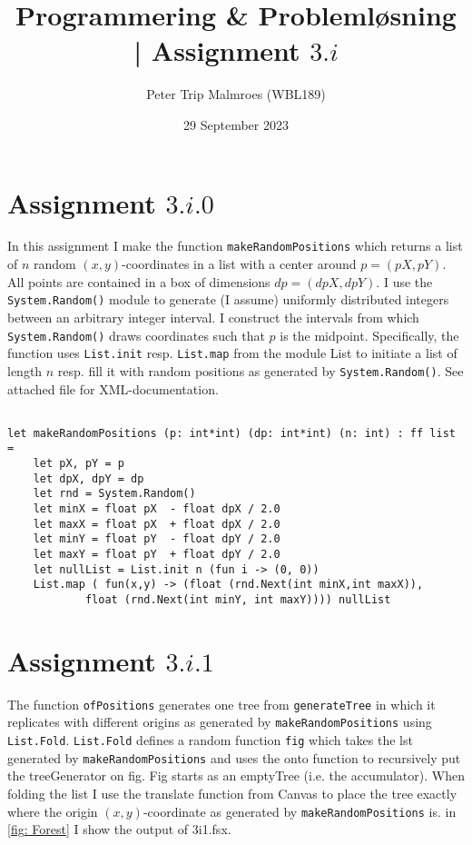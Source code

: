 \documentclass[a4paper]{article}
\title{Programmering \& Problemløsning | Assignment $3.i$}
\author{Peter Trip Malmroes (WBL189) }
\date{29 September 2023}
\begin{document}
\maketitle %

\section*{Assignment $3.i.0$}

In this assignment I make the function \verb|makeRandomPositions| which returns a list of $n$ random $(x,y)$-coordinates in a list with a center around $p=(pX,pY)$. All points are contained in a box of dimensions $dp = (dpX,dpY)$. I use the \verb|System.Random()| module to generate (I assume) uniformly distributed integers between an arbitrary integer interval. I construct the intervals from which \verb|System.Random()| draws coordinates such that $p$ is the midpoint. Specifically, the function uses \verb|List.init| resp. \verb|List.map| from the module List to initiate a list of length $n$ resp. fill it with random positions as generated by \verb|System.Random()|. See attached file for XML-documentation. 



\lstset{language=FSharp}
\begin{lstlisting}

let makeRandomPositions (p: int*int) (dp: int*int) (n: int) : ff list =
    let pX, pY = p 
    let dpX, dpY = dp
    let rnd = System.Random()
    let minX = float pX  - float dpX / 2.0 
    let maxX = float pX  + float dpX / 2.0
    let minY = float pY  - float dpY / 2.0
    let maxY = float pY  + float dpY / 2.0
    let nullList = List.init n (fun i -> (0, 0))
    List.map ( fun(x,y) -> (float (rnd.Next(int minX,int maxX)),
            float (rnd.Next(int minY, int maxY)))) nullList
\end{lstlisting}

\pagebreak

\section*{Assignment $3.i.1$}

The function \verb|ofPositions| generates one tree from \verb|generateTree| in which it replicates with different origins as generated by \verb|makeRandomPositions| using \verb|List.Fold|. \verb|List.Fold| defines a random function \verb|fig| which takes the lst generated by \verb|makeRandomPositions| and uses the onto function to recursively put the treeGenerator on fig. Fig starts as an emptyTree (i.e. the accumulator). When folding the list I use the translate function from Canvas to place the tree exactly where the origin $(x,y)$-coordinate as generated by \verb|makeRandomPositions| is. in \cref{fig: Forest} I show the output of 3i1.fsx. 
\end{document}
